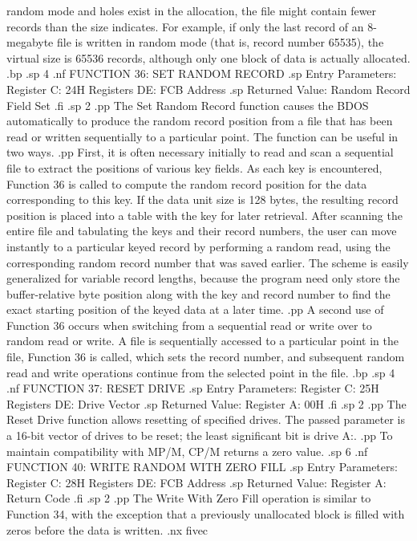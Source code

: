 random mode and holes exist in the allocation, the file might 
contain fewer records than the size indicates.  For example, 
if only the last record of an 8-megabyte file is written in 
random mode (that is, record number 65535), the virtual size is 
65536 records, although only one block of data is actually 
allocated.
.bp
.sp 4
.nf
                 FUNCTION 36:  SET RANDOM RECORD
.sp
                 Entry Parameters:
                       Register C:  24H
                     Registers DE:  FCB Address
.sp 
                 Returned Value:
                        Random Record Field Set
.fi
.sp 2
.pp
The Set Random Record function causes the BDOS automatically 
to produce the random record position from a file that has been 
read or written sequentially to a particular point.  The function 
can be useful in two ways.
.pp
First, it is often necessary initially to read and scan a 
sequential file to extract the positions of various key fields.  
As each key is encountered, Function 36 is called to compute the 
random record position for the data corresponding to this key.  If 
the data unit size is 128 bytes, the resulting record position is 
placed into a table with the key for later retrieval.  After 
scanning the entire file and tabulating the keys and their record 
numbers, the user can move instantly to a particular keyed record 
by performing a random read, using the corresponding random 
record number that was saved earlier.  The scheme is easily 
generalized for variable record lengths, because the program need 
only store the buffer-relative byte position along with the key 
and record number to find the exact starting position of the 
keyed data at a later time.  
.pp
A second use of Function 36 occurs when switching from a 
sequential read or write over to random read or write.  A file is 
sequentially accessed to a particular point in the file, Function 
36 is called, which sets the record number, and subsequent random 
read and write operations continue from the selected point in the 
file.
.bp
.sp 4
.nf
                    FUNCTION 37:  RESET DRIVE
.sp
                 Entry Parameters:
                       Register C:  25H
                     Registers DE:  Drive Vector
.sp
                 Returned Value:
                      Register  A:  00H
.fi
.sp 2
.pp
The Reset Drive function allows resetting of specified drives.  
The passed parameter is a 16-bit vector of drives to be reset; 
the least significant bit is drive A:.
.pp
To maintain compatibility with MP/M, CP/M returns a zero value.
.sp 6
.nf
            FUNCTION 40:  WRITE RANDOM WITH ZERO FILL
.sp
                 Entry Parameters:
                       Register C:  28H
                     Registers DE:  FCB Address
.sp 
                 Returned Value:
                      Register  A:  Return Code
.fi
.sp 2
.pp
The Write With Zero Fill operation is similar to Function 34, 
with the exception that a previously unallocated block is filled 
with zeros before the data is written.
.nx fivec
